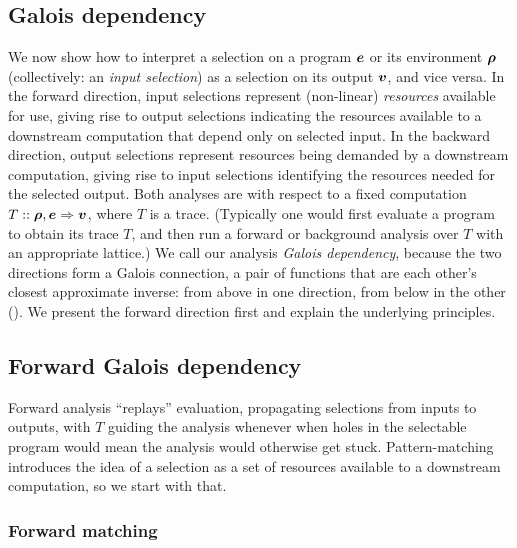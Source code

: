 \subsection{Galois dependency}
\label{sec:data-dependencies:analyses}

We now show how to interpret a selection on a program $\bm{e}$ or its environment $\bm{\rho}$ (collectively: an \emph{input selection}) as a selection on its output $\bm{v}$, and vice versa. In the forward direction, input selections represent (non-linear) \emph{resources} available for use, giving rise to output selections indicating the resources available to a downstream computation that depend only on selected input. In the backward direction, output selections represent resources being demanded by a downstream computation, giving rise to input selections identifying the resources needed for the selected output. Both analyses are with respect to a fixed computation $T :: \bm{\rho}, \bm{e} \Rightarrow \bm{v}$, where $T$ is a trace. (Typically one would first evaluate a program to obtain its trace $T$, and then run a forward or background analysis over $T$ with an appropriate lattice.) We call our analysis \emph{Galois dependency}, because the two directions form a Galois connection, a pair of functions that are each other's closest approximate inverse: from above in one direction, from below in the other ().  We present the forward direction first and explain the underlying principles.

\subsection{Forward Galois dependency}
\label{sec:data-dependencies:analyses:fwd}

Forward analysis ``replays'' evaluation, propagating selections from inputs to outputs, with $T$ guiding the analysis whenever when holes in the selectable program would mean the analysis would otherwise get stuck. Pattern-matching introduces the idea of a selection as a set of resources available to a downstream computation, so we start with that.



\subsubsection{Forward matching}
\label{sec:data-dependencies:analyses:fwd:pattern-match}

